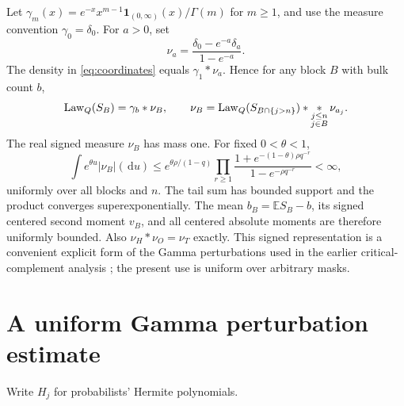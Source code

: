 \documentclass[11pt,a4paper]{article}
\theoremstyle{remark}\newtheorem*{ednote}{Editorial note (ProveIt, 2026-10-01)}
\newcommand{\E}{\mathbb E}\newcommand{\R}{\mathbb R}\newcommand{\TV}{\operatorname{TV}}
\newcommand{\ind}{\mathbf1}\newcommand{\dd}{\,\mathrm d}\newcommand{\ph}{\varphi}
\begin{document}
Let $\gamma_m(x)=e^{-x}x^{m-1}\ind_{(0,\infty)}(x)/\Gamma(m)$ for $m\ge1$, and use the measure convention $\gamma_0=\delta_0$. For $a>0$, set
\[
 \nu_a=\frac{\delta_0-e^{-a}\delta_a}{1-e^{-a}}.
\]
The density in \eqref{eq:coordinates} equals $\gamma_1*\nu_a$. Hence for any block $B$ with bulk count $b$,
\begin{equation}\label{eq:signed}
 \operatorname{Law}_Q(S_B)=\gamma_b*\nu_B,\qquad
 \nu_B=\operatorname{Law}_Q(S_{B\cap\{j>n\}})
              *\mathop{*}_{\substack{j\le n\cr j\in B}}\nu_{a_j}.
\end{equation}
The real signed measure $\nu_B$ has mass one. For fixed $0<\theta<1$,
\begin{equation}\label{eq:weighted}
 \int e^{\theta u}|\nu_B|(\dd u)
 \le e^{\theta\rho/(1-q)}
 \prod_{r\ge1}\frac{1+e^{-(1-\theta)\rho q^{-r}}}
                      {1-e^{-\rho q^{-r}}}<\infty,
\end{equation}
uniformly over all blocks and $n$. The tail sum has bounded support and the product converges superexponentially. The mean $b_B=\E S_B-b$, its signed centered second moment $v_B$, and all centered absolute moments are therefore uniformly bounded. Also $\nu_H*\nu_O=\nu_T$ exactly. This signed representation is a convenient explicit form of the Gamma perturbations used in the earlier critical-complement analysis \cite{Critical}; the present use is uniform over arbitrary masks.

\section{A uniform Gamma perturbation estimate}
Write $H_j$ for probabilists' Hermite polynomials.
\end{document}
